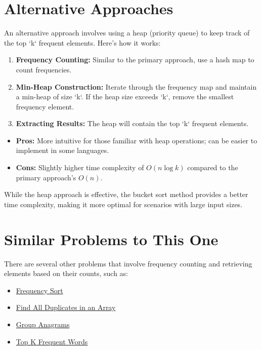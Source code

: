 \section*{Alternative Approaches}
An alternative approach involves using a heap (priority queue) to keep track of the top `k` frequent elements. Here's how it works:

\begin{enumerate}
    \item \textbf{Frequency Counting:} Similar to the primary approach, use a hash map to count frequencies.
    \item \textbf{Min-Heap Construction:} Iterate through the frequency map and maintain a min-heap of size `k`. If the heap size exceeds `k`, remove the smallest frequency element.
    \item \textbf{Extracting Results:} The heap will contain the top `k` frequent elements.
\end{enumerate}

\begin{itemize}
    \item \textbf{Pros:} More intuitive for those familiar with heap operations; can be easier to implement in some languages.
    \item \textbf{Cons:} Slightly higher time complexity of \(O(n \log k)\) compared to the primary approach's \(O(n)\).
\end{itemize}

While the heap approach is effective, the bucket sort method provides a better time complexity, making it more optimal for scenarios with large input sizes.


\section*{Similar Problems to This One}
There are several other problems that involve frequency counting and retrieving elements based on their counts, such as:
\begin{itemize}
    \item \hyperref[problem:frequency_sort]{Frequency Sort}
    \item \hyperref[problem:find_all_duplicates]{Find All Duplicates in an Array}
    \item \hyperref[problem:group_anagrams]{Group Anagrams}
    \item \hyperref[problem:top_k_frequent_words]{Top K Frequent Words}
\end{itemize}

